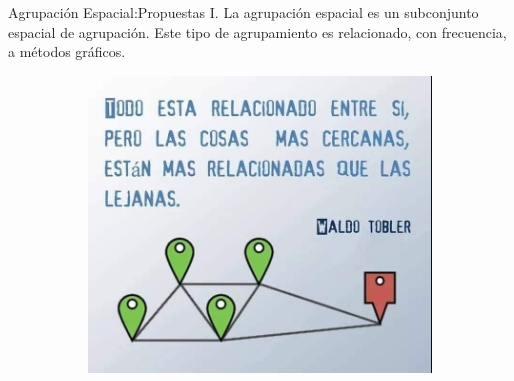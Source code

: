 
\begin{frame}[fragile]{Agrupación Espacial:}{Propuestas I.}
  La agrupación espacial es un subconjunto espacial de agrupación. Este tipo
  de agrupamiento es relacionado, con frecuencia, a métodos gráficos.
  \begin{figure}
    \centering
    \begin{subfigure}[b]{0.3\textwidth}
      \includegraphics[width=\textwidth]{./Imagenes/LeyGeo.png}
    \end{subfigure}
    \begin{subfigure}[b]{0.2\textwidth}

\end{subfigure}
\end{figure}
\end{frame}
